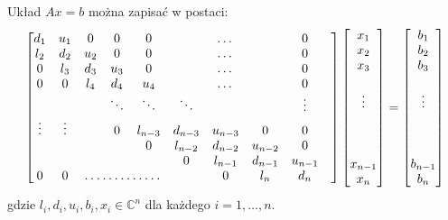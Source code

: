 \documentclass[12pt]{article}
\begin{document}
	Układ $Ax = b$ można zapisać w postaci:
	\[
	\begin{bmatrix}
		d_1    & u_1    & 0            & 0      & 0       &         & \dots   &         & 0       \\
		l_2    & d_2    & u_2          & 0      & 0       &         & \dots   &         & 0       \\
		0      & l_3    & d_3          & u_3    & 0       &         & \dots   &         & 0       \\
		0      & 0      & l_4          & d_4    & u_4     &         & \dots   &         & 0       \\
		       &        &              & \ddots & \ddots  & \ddots  &         &         & \vdots  \\
		\vdots & \vdots &              & 0      & l_{n-3} & d_{n-3} & u_{n-3} & 0       & 0       \\
		       &        &              &        & 0       & l_{n-2} & d_{n-2} & u_{n-2} & 0       \\
		       &        &              &        &         & 0       & l_{n-1} & d_{n-1} & u_{n-1} \\
		0      & 0      & \hdotsfor{3} &        & 0       & l_n     & d_n     &
	\end{bmatrix}
	\begin{bmatrix}
		x_1 \\
		x_2 \\
		x_3 \\
		\\
		\vdots\\
		\\
		\\
		\\
		x_{n-1} \\
		x_n
	\end{bmatrix}
	=
	\begin{bmatrix}
		b_1 \\
		b_2 \\
		b_3 \\
		\\
		\vdots\\
		\\
		\\
		\\
		b_{n-1} \\
		b_n
	\end{bmatrix}
	\]
	gdzie $l_i, d_i, u_i, b_i, x_i \in \mathbb{C}^n$ dla każdego $i=1, \dots , n$.
	
\end{document}
